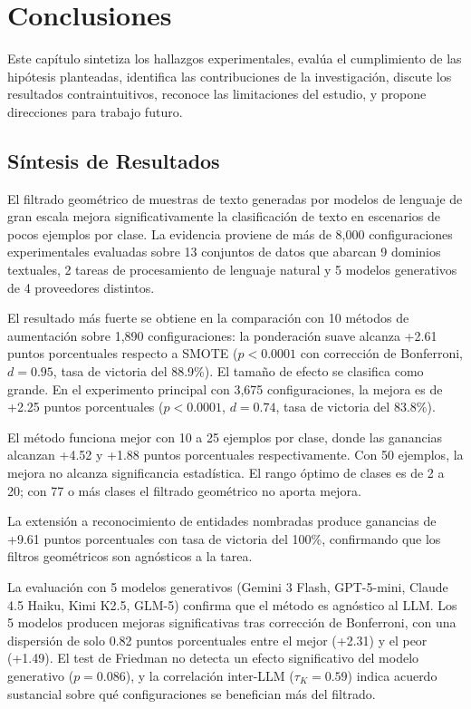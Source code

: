 
\chapter{Conclusiones}
\label{ch:conclusiones}

Este capítulo sintetiza los hallazgos experimentales, evalúa el cumplimiento de las hipótesis planteadas, identifica las contribuciones de la investigación, discute los resultados contraintuitivos, reconoce las limitaciones del estudio, y propone direcciones para trabajo futuro.

\section{Síntesis de Resultados}
\label{sec:sintesis_resultados}

El filtrado geométrico de muestras de texto generadas por modelos de lenguaje de gran escala mejora significativamente la clasificación de texto en escenarios de pocos ejemplos por clase. La evidencia proviene de más de 8,000 configuraciones experimentales evaluadas sobre 13 conjuntos de datos que abarcan 9 dominios textuales, 2 tareas de procesamiento de lenguaje natural y 5 modelos generativos de 4 proveedores distintos.

El resultado más fuerte se obtiene en la comparación con 10 métodos de aumentación sobre 1,890 configuraciones: la ponderación suave alcanza +2.61 puntos porcentuales respecto a SMOTE ($p < 0.0001$ con corrección de Bonferroni, $d = 0.95$, tasa de victoria del 88.9\%). El tamaño de efecto se clasifica como grande. En el experimento principal con 3,675 configuraciones, la mejora es de +2.25 puntos porcentuales ($p < 0.0001$, $d = 0.74$, tasa de victoria del 83.8\%).

El método funciona mejor con 10 a 25 ejemplos por clase, donde las ganancias alcanzan +4.52 y +1.88 puntos porcentuales respectivamente. Con 50 ejemplos, la mejora no alcanza significancia estadística. El rango óptimo de clases es de 2 a 20; con 77 o más clases el filtrado geométrico no aporta mejora.

La extensión a reconocimiento de entidades nombradas produce ganancias de +9.61 puntos porcentuales con tasa de victoria del 100\%, confirmando que los filtros geométricos son agnósticos a la tarea.

La evaluación con 5 modelos generativos (Gemini 3 Flash, GPT-5-mini, Claude 4.5 Haiku, Kimi K2.5, GLM-5) confirma que el método es agnóstico al LLM. Los 5 modelos producen mejoras significativas tras corrección de Bonferroni, con una dispersión de solo 0.82 puntos porcentuales entre el mejor (+2.31) y el peor (+1.49). El test de Friedman no detecta un efecto significativo del modelo generativo ($p = 0.086$), y la correlación inter-LLM ($\tau_K = 0.59$) indica acuerdo sustancial sobre qué configuraciones se benefician más del filtrado.

